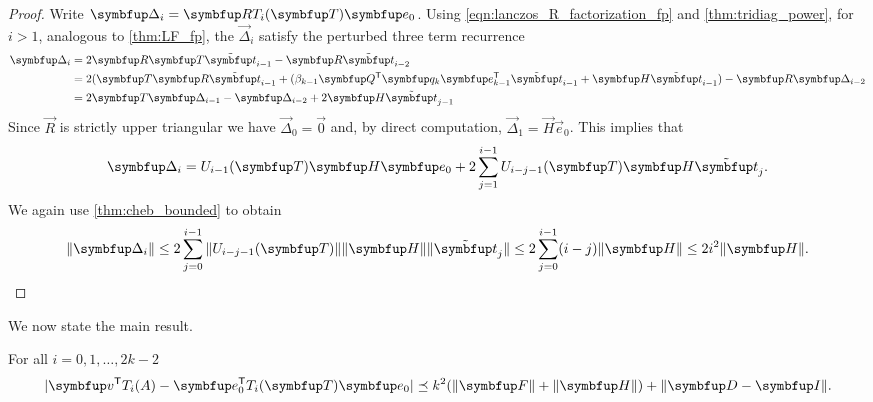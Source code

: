 \begin{proof}
    Write \( \vec{\Delta}_i =  \vec{R} T_i\mf{\vec{T}} \vec{e}_0 \).
    Using \cref{eqn:lanczos_R_factorization_fp} and \cref{thm:tridiag_power}, for \( i>1 \), analogous to \cref{thm:LF_fp}, the \( \vec{\Delta}_i \)    satisfy the perturbed three term recurrence
    \begin{align*}
        \vec{\Delta}_i
        &= 2 \vec{R}\vec{T}\tilde{\vec{t}}_{i-1} - \vec{R} \tilde{\vec{t}}_{i-2}
        \\&= 2(\vec{T}\vec{R} \tilde{\vec{t}}_{i-1} + (\beta_{k-1} \vec{Q}^\rT \vec{q}_k \vec{e}_{k-1}^\rT \tilde{\vec{t}}_{i-1} + \vec{H}  \tilde{\vec{t}}_{i-1}) - \vec{R} \vec{\Delta}_{i-2}
        \\&= 2 \vec{T} \vec{\Delta}_{i-1} - \vec{\Delta}_{i-2}  + 2\vec{H} \tilde{\vec{t}}_{j-1}
    \end{align*}
    Since \( \vec{R} \) is strictly upper triangular we have \( \vec{\Delta}_0 = \vec{0} \) and, by direct computation, \( \vec{\Delta}_1 = \vec{H} \vec{e}_0 \). 
    This implies that
    \begin{equation*}
        \vec{\Delta}_i 
        = U_{i-1}\mf{\vec{T}}  \vec{H} \vec{e}_0 + 2 \sum_{j=1}^{i-1} U_{i-j-1}\mf{\vec{T}} \vec{H} \tilde{\vec{t}}_{j}.
    \end{equation*}
    We again use \cref{thm:cheb_bounded} to obtain
    \begin{equation*}
        \| \vec{\Delta}_i \|
        \leq 2\sum_{j=0}^{i-1} \| U_{i-j-1}\mf{\vec{T}} \| \| \vec{H} \| \| \tilde{\vec{t}}_{j} \|
        \leq 2\sum_{j=0}^{i-1} (i-j) \| \vec{H} \|
        \leq 2 i^2 \| \vec{H} \|.
        \qedhere
    \end{equation*}
\end{proof}

We now state the main result.
\begin{theorem}
    \label{thm:QF_fp}
    For all \( i=0,1,\ldots, 2k-2 \)
    \begin{equation*}
        | \vec{v}^\rT T_i\mf{A} - \vec{e}_0^\rT T_i\mf{\vec{T}} \vec{e}_0 | \preceq k^2( \| \vec{F}\| + \| \vec{H} \|) + \| \vec{D} - \vec{I} \|.
    \end{equation*}
\end{theorem}


